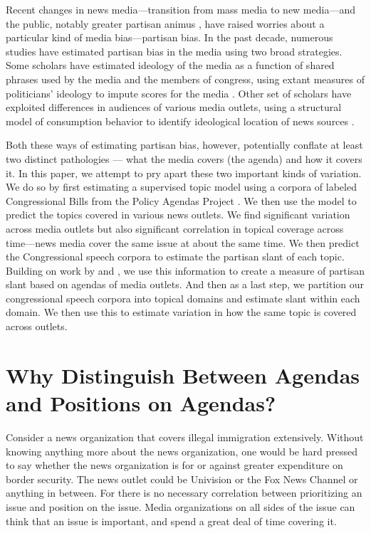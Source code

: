 \documentclass[12pt, letterpaper]{article}
\begin{document}
Recent changes in news media---transition from mass media to new media---and the public, notably greater partisan animus \citep{iyengar2012affect}, have raised worries about a particular kind of media bias---partisan bias. In the past decade, numerous studies have estimated partisan bias in the media using two broad strategies. Some scholars have estimated ideology of the media as a function of shared phrases used by the media and the members of congress, using extant measures of politicians' ideology to impute scores for the media \citep[see, for e.g.,][]{groseclose2005, gentzkow2010}. Other set of scholars have exploited differences in audiences of various media outlets, using a structural model of consumption behavior to identify ideological location of news sources \citep[see, for e.g.,][]{barbera2014follow, gentzkow2011}. 

Both these ways of estimating partisan bias, however, potentially conflate at least two distinct pathologies --- what the media covers (the agenda) and how it covers it. In this paper, we attempt to pry apart these two important kinds of variation. We do so by first estimating a supervised topic model using a corpora of labeled Congressional Bills from the Policy Agendas Project \citep{baumgartner2003policy}. We then use the model to predict the topics covered in various news outlets. We find significant variation across media outlets but also significant correlation in topical coverage across time---news media cover the same issue at about the same time. We then predict the Congressional speech corpora to estimate the partisan slant of each topic. Building on work by \citet{puglisi2011being} and \citet{larcinese2011partisan}, we use this information to create a measure of partisan slant based on agendas of media outlets. And then as a last step, we partition our congressional speech corpora into topical domains and estimate slant within each domain. We then use this to estimate variation in how the same topic is covered across outlets.  

\section*{Why Distinguish Between Agendas and Positions on Agendas?}

Consider a news organization that covers illegal immigration extensively. Without knowing anything more about the news organization, one would be hard pressed to say whether the news organization is for or against greater expenditure on border security. The news outlet could be Univision or the Fox News Channel or anything in between. For there is no necessary correlation between prioritizing an issue and position on the issue.  Media organizations on all sides of the issue can think that an issue is important, and spend a great deal of time covering it. 
\end{document}
